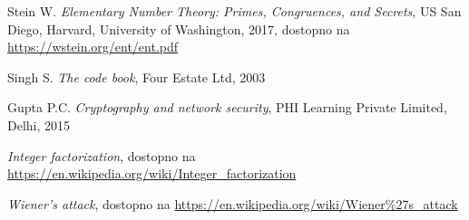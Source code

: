 \documentclass[a4paper, 12pt]{article} %
\begin{document}
\newpage
\begin{thebibliography}{9}
Stein W.
\textit{Elementary Number Theory: Primes, Congruences, and Secrets},
US San Diego, Harvard, University of Washington, 2017,
dostopno na \url{https://wstein.org/ent/ent.pdf}

Singh S.
\textit{The code book},
Four Estate Ltd, 2003

Gupta P.C. 
\textit{Cryptography and network security},
PHI Learning Private Limited, Delhi, 2015

\textit{Integer factorization},
dostopno na \url{https://en.wikipedia.org/wiki/Integer_factorization}

\textit{Wiener's attack},
dostopno na \url{https://en.wikipedia.org/wiki/Wiener\%27s_attack}

\end{thebibliography}
\end{document}
